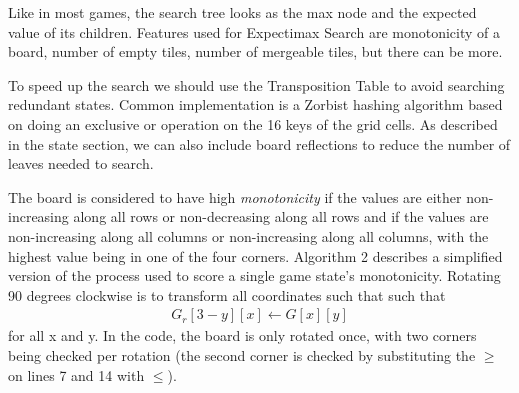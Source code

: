 \documentclass[letterpaper]{article} %
\begin{document}
Like in most games, the search tree looks as the max node and the expected value of its children. Features used for Expectimax Search are monotonicity of a board, number of empty tiles, number of mergeable tiles, but there can be more.

To speed up the search we should use the Transposition Table to avoid searching redundant states. Common implementation is a Zorbist hashing algorithm based on doing an exclusive or operation on the 16 keys of the grid cells. As described in the state section, we can also include board reflections to reduce the number of leaves needed to search.

The board is considered to have high \textit{monotonicity} if the values are either non-increasing along all rows or non-decreasing along all rows and if the values are non-increasing along all columns or non-increasing along all columns, with the highest value being in one of the four corners. Algorithm 2 describes a simplified version of the process used to score a single game state’s monotonicity. Rotating 90 degrees clockwise is to transform all coordinates such that such that 
\begin{align}
    G_r [3 - y][x] \gets G[x][y]
\end{align}
for all x and y. In the code, the board is only rotated once, with two corners being checked per rotation (the second corner is checked by substituting the $\geq$ on lines 7 and 14 with $\leq$).
\end{document}
